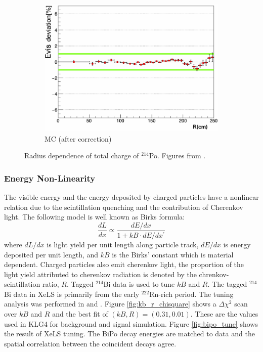 \begin{figure}[htb]
\vspace{1cm}

\begin{subfigure}[b]{0.45\textwidth}
    \centering
    \includegraphics[width=\textwidth]{po214_mc_corr.png}
    \caption{MC (after correction)}
    \label{fig:po214_mc_after}
\end{subfigure}

\caption{Radius dependence of total charge of $^{214}$Po. Figures from \cite{ozaki_phd}.}
\label{fig:po214_alpha}
\end{figure}

\subsubsection*{Energy Non-Linearity}
The visible energy and the energy deposited by charged particles have a nonlinear relation due to the scintillation quenching and the contribution of Cherenkov light. The following model is well known as Birks formula:
\begin{equation}
    \label{eq:birks_law}
    \frac{dL}{dx}\propto\frac{dE/dx}{1+kB\cdot dE/dx^\prime}
\end{equation}
where $dL/dx$ is light yield per unit length along particle track, $dE/dx$ is energy deposited per unit length, and $kB$ is the Birks' constant which is material dependent. Charged particles also emit cherenkov light, the proportion of the light yield attributed to cherenkov radiation is denoted by the chrenkov-scintillation ratio, $R$. Tagged $^{214}$Bi data is used to tune $kB$ and $R$. The tagged $^{214}$Bi data in XeLS is primarily from the early $^{222}$Rn-rich period. The tuning analysis was performed in \cite{ozaki_phd} and \cite{takeuchi_phd}. Figure \ref{fig:kb_r_chisquare} shows a $\Delta\chi^2$ scan over $kB$ and $R$ and the best fit of $(kB, R)=(0.31, 0.01)$. These are the values used in KLG4 for background and signal simulation. Figure \ref{fig:bipo_tune} shows the result of XeLS tuning. The BiPo decay energies are matched to data and the spatial correlation between the coincident decays agree.

